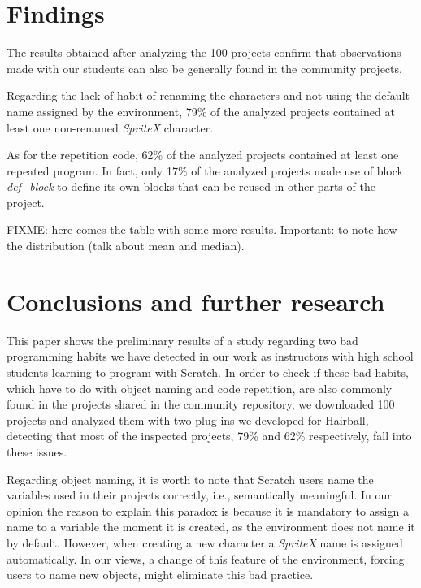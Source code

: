 \documentclass[conference]{format/IEEEtran}
\begin{document}
\section{Findings}
\label{sec:findings}

The results obtained after analyzing the 100 projects confirm that observations made with our students can also be generally found in the community projects.

Regarding the lack of habit of renaming the characters and not using the default name assigned by the environment, 79\% of the analyzed projects contained at least one non-renamed \textit{SpriteX} character.

As for the repetition code, 62\% of the analyzed projects contained at least one repeated program. In fact, only 17\% of the analyzed projects made use of block \textit{def\_block} to define its own blocks that can be reused in other parts of the project. 

FIXME: here comes the table with some more results. Important: to note how the distribution (talk about mean and median).



\section{Conclusions and further research}
\label{sec:conclusions}


This paper shows the preliminary results of a study regarding two bad programming habits we have detected in our work as instructors with high school students learning to program with Scratch. In order to check if these bad habits, which have to do with object naming and code repetition, are also commonly found in the projects shared in the community repository, we downloaded 100 projects and analyzed them with two plug-ins we developed for Hairball, detecting that most of the inspected projects, 79\% and 62\%  respectively, fall into these issues.

Regarding object naming, it is worth to note that Scratch users name the variables used in their projects correctly, i.e., semantically meaningful. In our opinion the reason to explain this paradox is because it is mandatory to assign a name to a variable the moment it is created, as the environment does not name it by default. However, when creating a new character a  \textit{SpriteX} name is assigned automatically. In our views, a change of this feature of the environment, forcing users to name new objects, might eliminate this bad practice.
\end{document}
